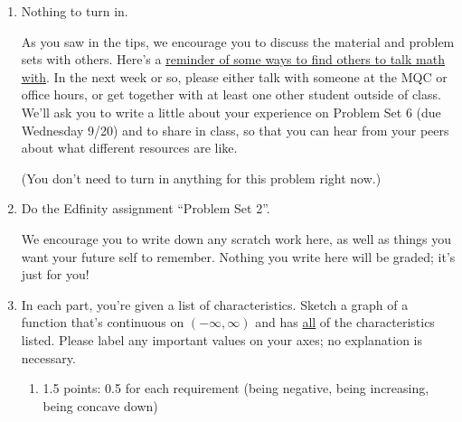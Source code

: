 \documentclass{article}
\makeatletter
\let\@href=\href
\renewcommand{\href}[2]{\@href{#1}{\ul{#2}}}
\newcommand{\doedfinity}[2][\newpage]{
  \begin{problem}[#1]
    Do the Edfinity assignment ``Problem Set #2''.

    We encourage you to write down any scratch work here, as well as
    things you want your future self to remember. Nothing you write
    here will be graded; it's just for you!
  \end{problem}
}
\makeatother
\begin{document}
\begin{enumerate}
\item 

  \begin{grading}
    Nothing to turn in.
  \end{grading}

  As you saw in the tips, we encourage you to discuss the material and problem sets with others. Here's a \href{https://people.math.harvard.edu/~jjchen/mathma/talk-math.html}{reminder of some ways to find others to talk math with}. In the next week or so, please either talk with someone at the MQC or office hours, or get together with at least one other student outside of class. We'll ask you to write a little about your experience on Problem Set 6 (due Wednesday 9/20) and to share in class, so that you can hear from your peers about what different resources are like.

  (You don't need to turn in anything for this problem right now.)

  \pspace{\newpage}

\item  {}

  \doedfinity{2}

\item %

  In each part, you're given a list of characteristics. Sketch a graph of a function that's continuous on $(-\infty, \infty)$ and has \uline{all} of the characteristics listed. Please label any important values on your axes; no explanation is necessary.

  \begin{enumerate}

  \item

    \begin{grading}
      1.5 points: 0.5 for each requirement (being negative, being increasing, being concave down)
    \end{grading}


\end{enumerate}
\end{enumerate}
\end{document}

